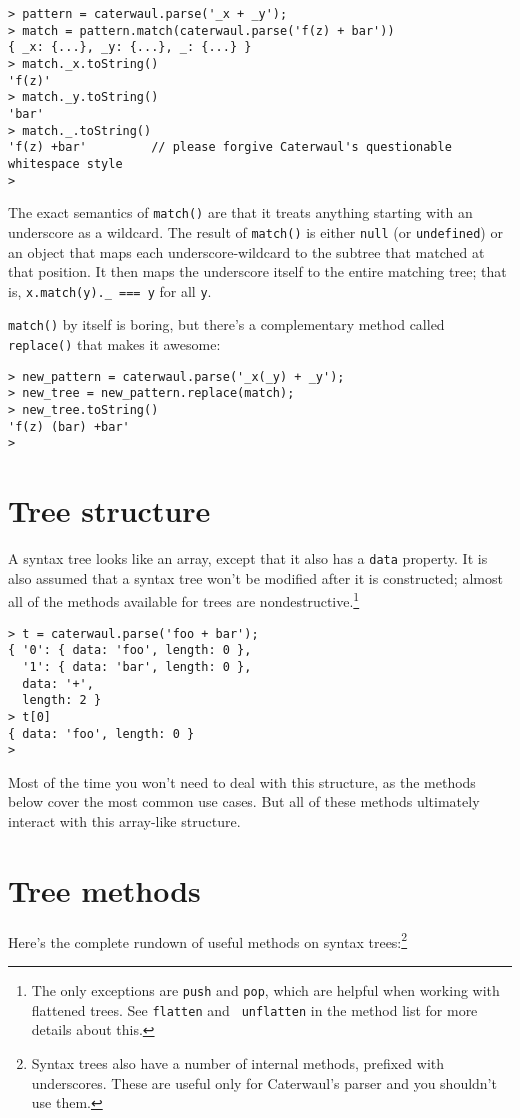 \documentclass{report}
\begin{document}
\begin{verbatim}
> pattern = caterwaul.parse('_x + _y');
> match = pattern.match(caterwaul.parse('f(z) + bar'))
{ _x: {...}, _y: {...}, _: {...} }
> match._x.toString()
'f(z)'
> match._y.toString()
'bar'
> match._.toString()
'f(z) +bar'         // please forgive Caterwaul's questionable whitespace style
>
\end{verbatim}

  The exact semantics of {\tt match()} are that it treats anything starting with an underscore as a wildcard. The result of {\tt match()} is either {\tt null} (or {\tt undefined}) or an object
  that maps each underscore-wildcard to the subtree that matched at that position. It then maps the underscore itself to the entire matching tree; that is, \verb|x.match(y)._ === y| for all
  {\tt y}.

  {\tt match()} by itself is boring, but there's a complementary method called {\tt replace()} that makes it awesome:

\begin{verbatim}
> new_pattern = caterwaul.parse('_x(_y) + _y');
> new_tree = new_pattern.replace(match);
> new_tree.toString()
'f(z) (bar) +bar'
>
\end{verbatim}

\section{Tree structure}
    A syntax tree looks like an array, except that it also has a {\tt data} property. It is also assumed that a syntax tree won't be modified after it is constructed; almost all of the methods
    available for trees are nondestructive.\footnote{The only exceptions are {\tt push} and {\tt pop}, which are helpful when working with flattened trees. See {\tt flatten} and {\tt
    unflatten} in the method list for more details about this.}

\begin{verbatim}
> t = caterwaul.parse('foo + bar');
{ '0': { data: 'foo', length: 0 },
  '1': { data: 'bar', length: 0 },
  data: '+',
  length: 2 }
> t[0]
{ data: 'foo', length: 0 }
>
\end{verbatim}

    Most of the time you won't need to deal with this structure, as the methods below cover the most common use cases. But all of these methods ultimately interact with this array-like
    structure.

\section{Tree methods}
    Here's the complete rundown of useful methods on syntax trees:\footnote{Syntax trees also have a number of internal methods, prefixed with underscores. These are useful only for
    Caterwaul's parser and you shouldn't use them.}
\end{document}
